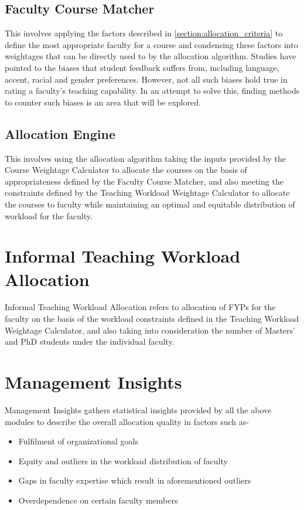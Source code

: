 \subsection{Faculty Course Matcher}

This involves applying the factors described in \autoref{section:allocation_criteria} to define the most appropriate faculty for a course and condensing these factors into weightages that can be directly used to by the allocation algorithm. Studies have pointed to the biases that student feedback suffers from, including language, accent, racial and gender preferences. However, not all such biases hold true in rating a faculty's teaching capability. In an attempt to solve this, finding methods to counter such biases is an area that will be explored.

\subsection{Allocation Engine}

This involves using the allocation algorithm taking the inputs provided by the Course Weightage Calculator to allocate the courses on the basis of appropriateness defined by the Faculty Course Matcher, and also meeting the constraints defined by the Teaching Workload Weightage Calculator to allocate the courses to faculty while maintaining an optimal and equitable distribution of workload for the faculty.

\section{Informal Teaching Workload Allocation}

Informal Teaching Workload Allocation refers to allocation of FYPs for the faculty on the basis of the workload constraints defined in the Teaching Workload Weightage Calculator, and also taking into consideration the number of Masters' and PhD students under the individual faculty.

\section{Management Insights}

Management Insights gathers statistical insights provided by all the above modules to describe the overall allocation quality in factors such as-
\begin{itemize}
\item Fulfilment of organizational goals
\item Equity and outliers in the workload distribution of faculty
\item Gaps in faculty expertise which result in aforementioned outliers
\item Overdependence on certain faculty members
\end{itemize}

